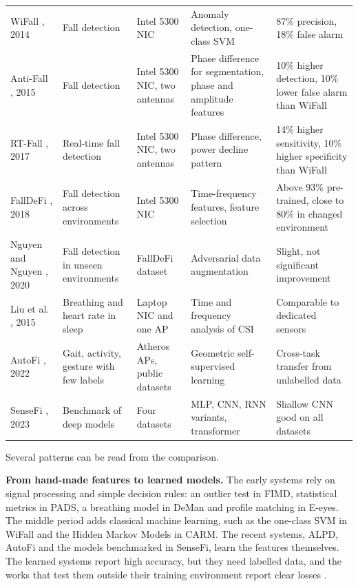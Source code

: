 {\begin{longtable}{L{2.25cm}L{2.2cm}L{2.5cm}L{3.3cm}L{3.5cm}}
WiFall \cite{wifall}, 2014 & Fall detection & Intel 5300 NIC & Anomaly detection, one-class SVM & 87\% precision, 18\% false alarm\\\addlinespace
Anti-Fall \cite{antifall}, 2015 & Fall detection & Intel 5300 NIC, two antennas & Phase difference for segmentation, phase and amplitude features & 10\% higher detection, 10\% lower false alarm than WiFall\\\addlinespace
RT-Fall \cite{rtfall}, 2017 & Real-time fall detection & Intel 5300 NIC, two antennas & Phase difference, power decline pattern & 14\% higher sensitivity, 10\% higher specificity than WiFall\\\addlinespace
FallDeFi \cite{falldefi}, 2018 & Fall detection across environments & Intel 5300 NIC & Time-frequency features, feature selection & Above 93\% pre-trained, close to 80\% in changed environment\\\addlinespace
Nguyen and Nguyen \cite{adafall}, 2020 & Fall detection in unseen environments & FallDeFi dataset & Adversarial data augmentation & Slight, not significant improvement\\\addlinespace
Liu et al. \cite{vitalsigns}, 2015 & Breathing and heart rate in sleep & Laptop NIC and one AP & Time and frequency analysis of CSI & Comparable to dedicated sensors\\\addlinespace
AutoFi \cite{autofi}, 2022 & Gait, activity, gesture with few labels & Atheros APs, public datasets & Geometric self-supervised learning & Cross-task transfer from unlabelled data\\\addlinespace
SenseFi \cite{sensefi}, 2023 & Benchmark of deep models & Four datasets & MLP, CNN, RNN variants, transformer & Shallow CNN good on all datasets\\
\end{longtable}
}

Several patterns can be read from the comparison.

\textbf{From hand-made features to learned models.} The early systems rely on signal processing and simple decision rules: an outlier test in FIMD, statistical metrics in PADS, a breathing model in DeMan and profile matching in E-eyes. The middle period adds classical machine learning, such as the one-class SVM in WiFall and the Hidden Markov Models in CARM. The recent systems, ALPD, AutoFi and the models benchmarked in SenseFi, learn the features themselves. The learned systems report high accuracy, but they need labelled data, and the works that test them outside their training environment report clear losses \cite{falldefi,adafall}.

